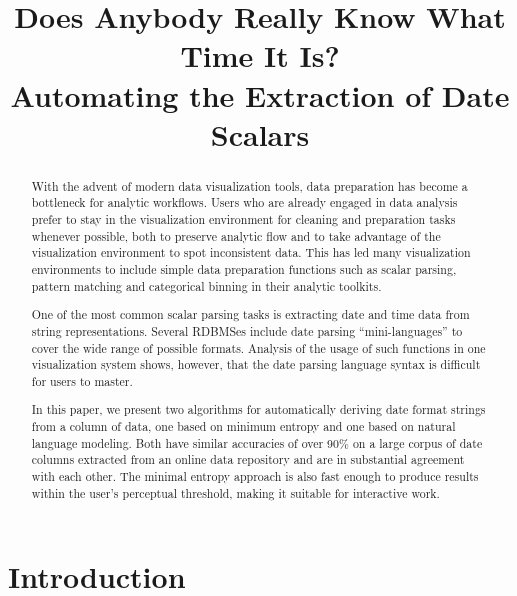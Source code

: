 \documentclass{acm_proc_article-sp}
\begin{document}

\title{Does Anybody Really Know What Time It Is?\\
Automating the Extraction of Date Scalars}


\maketitle
\begin{abstract}
With the advent of modern data visualization tools, data preparation has become a bottleneck for analytic workflows. Users who are already engaged in data analysis prefer to stay in the visualization environment for cleaning and preparation tasks whenever possible, both to preserve analytic flow and to take advantage of the visualization environment to spot inconsistent data. This has led many visualization environments to include simple data preparation functions such as scalar parsing, pattern matching and categorical binning in their analytic toolkits. 

One of the most common scalar parsing tasks is extracting date and time data from string representations. Several RDBMSes include date parsing ``mini-languages'' to cover the wide range of possible formats. Analysis of the usage of such functions in one visualization system shows, however, that the date parsing language syntax is difficult for users to master. 

In this paper, we present two algorithms for automatically deriving date format strings from a column of data, one based on minimum entropy and one based on natural language modeling. Both have similar accuracies of over 90\% on a large corpus of date columns extracted from an online data repository and are in substantial agreement with each other. The minimal entropy approach is also fast enough to produce results within the user's perceptual threshold, making it suitable for interactive work.
\end{abstract}



\section{Introduction}

\end{document}
